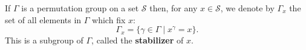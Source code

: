 If $\Gamma$ is a permutation group on a set $\mathcal{S}$ then, for any $x \in \mathcal{S}$, we denote by $\Gamma_x$ the set of all elements in $\Gamma$ which fix $x$:
$$\Gamma_x = \{\gamma \in \Gamma \mid x^\gamma = x\}.$$
This is a subgroup of $\Gamma$, called the \textbf{stabilizer} of $x$.
